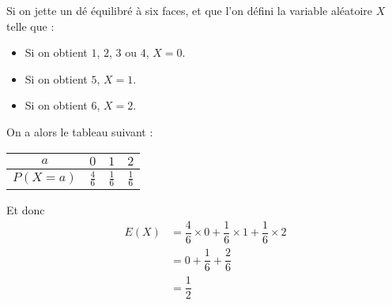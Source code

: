 \documentclass[
	classe=$1^{ere}STI2D$
]{coursclass}
\begin{document}
\begin{exemple}
	Si on jette un dé équilibré à six faces, et que l'on défini la variable aléatoire $X$ telle que :
	\begin{itemize}
		\item Si on obtient $1$, $2$, $3$ ou $4$, $X = 0$.
		\item Si on obtient $5$, $X = 1$.
		\item Si on obtient $6$, $X = 2$.
	\end{itemize}

	On a alors le tableau suivant :
	\begin{tabular}{|c|c|c|c|}
		\hline
		$a$        & $0$            & $1$            & $2$            \\ \hline
		$P(X = a)$ & $\frac{4}{6}$ & $\frac{1}{6}$ & $\frac{1}{6}$ \\ \hline
	\end{tabular}

	Et donc
	\begin{align*}
		E(X) & = \dfrac{4}{6}×0 + \dfrac{1}{6}×1 + \dfrac{1}{6}×2 \\
		     & = 0 + \dfrac{1}{6} + \dfrac{2}{6}                  \\
		     & = \dfrac{1}{2}
	\end{align*}
\end{exemple}
\end{document}
